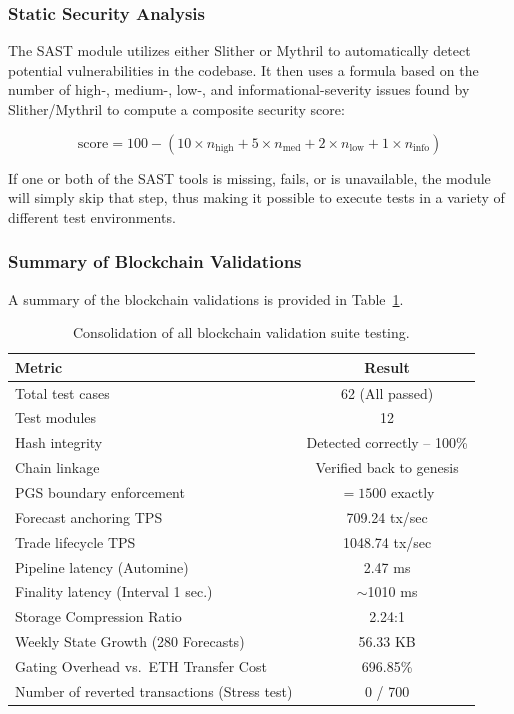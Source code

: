 \documentclass{ieeeaccess}
\begin{document}
\subsubsection{Static Security Analysis}

The SAST module utilizes either Slither or Mythril to automatically detect potential vulnerabilities in the codebase. It then uses a formula based on the number of high-, medium-, low-, and informational-severity issues found by Slither/Mythril to compute a composite security score:

\begin{equation}
\text{score}=100-(10\times n_{\text{high}}+5\times n_{\text{med}}+2\times n_{\text{low}}+1\times n_{\text{info}})
\end{equation}

If one or both of the SAST tools is missing, fails, or is unavailable, the module will simply skip that step, thus making it possible to execute tests in a variety of different test environments.

\subsubsection{Summary of Blockchain Validations}

A summary of the blockchain validations is provided in Table~\ref{tab:blockchain_validation_summary}.

\begin{table}[!t]
\caption{Consolidation of all blockchain validation suite testing.}
\label{tab:blockchain_validation_summary}
\centering
\begin{tabular}{lc}
\toprule
\textbf{Metric} & \textbf{Result} \\
\midrule
Total test cases & 62 (All passed) \\
Test modules & 12 \\
Hash integrity & Detected correctly -- 100\% \\
Chain linkage & Verified back to genesis \\
PGS boundary enforcement & $=1500$ exactly \\
Forecast anchoring TPS & 709.24 tx/sec \\
Trade lifecycle TPS & 1048.74 tx/sec \\
Pipeline latency (Automine) & 2.47 ms \\
Finality latency (Interval 1 sec.) & $\sim$1010 ms \\
Storage Compression Ratio & 2.24:1 \\
Weekly State Growth (280 Forecasts) & 56.33 KB \\
Gating Overhead vs.\ ETH Transfer Cost & 696.85\% \\
Number of reverted transactions (Stress test) & 0 / 700 \\
\bottomrule
\end{tabular}
\end{table}
\end{document}
